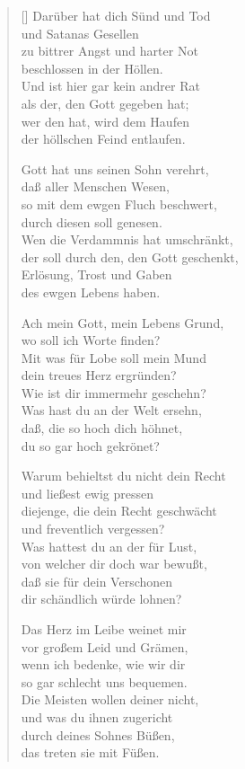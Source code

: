 \begin{multicols}{2}
\begin{verse}[\versewidth]
 Darüber hat dich Sünd und Tod\\
und Satanas Gesellen\\
zu bittrer Angst und harter Not\\
beschlossen in der Höllen.\\
Und ist hier gar kein andrer Rat\\
als der, den Gott gegeben hat;\\
wer den hat, wird dem Haufen\\
der höllschen Feind entlaufen.

 Gott hat uns seinen Sohn verehrt,\\
daß aller Menschen Wesen,\\
so mit dem ewgen Fluch beschwert,\\
durch diesen soll genesen.\\
Wen die Verdammnis hat umschränkt,\\
der soll durch den, den Gott geschenkt,\\
Erlösung, Trost und Gaben\\
des ewgen Lebens haben.

 Ach mein Gott, mein Lebens Grund,\\
wo soll ich Worte finden?\\
Mit was für Lobe soll mein Mund\\
dein treues Herz ergründen?\\
Wie ist dir immermehr geschehn?\\
Was hast du an der Welt ersehn,\\
daß, die so hoch dich höhnet,\\
du so gar hoch gekrönet?

 Warum behieltst du nicht dein Recht\\
und ließest ewig pressen\\
diejenge, die dein Recht geschwächt\\
und freventlich vergessen?\\
Was hattest du an der für Lust,\\
von welcher dir doch war bewußt,\\
daß sie für dein Verschonen\\
dir schändlich würde lohnen?

 Das Herz im Leibe weinet mir\\
vor großem Leid und Grämen,\\
wenn ich bedenke, wie wir dir\\
so gar schlecht uns bequemen.\\
Die Meisten wollen deiner nicht,\\
und was du ihnen zugericht\\
durch deines Sohnes Büßen,\\
das treten sie mit Füßen.


\end{verse}
\end{multicols}

